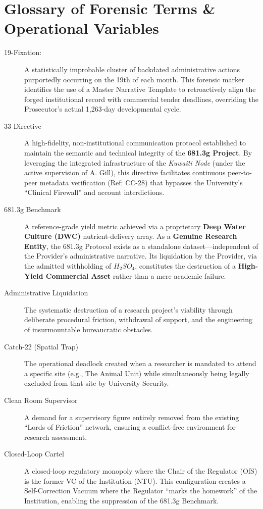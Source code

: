\documentclass{EMBASSY}
\begin{document}
\section{Glossary of Forensic Terms \& Operational Variables}
\begin{description}
	\item[19-Fixation:] A statistically improbable cluster of backdated administrative actions purportedly occurring on the 19th of each month. This forensic marker identifies the use of a Master Narrative Template to retroactively align the forged institutional record with commercial tender deadlines, overriding the Prosecutor’s actual 1,263-day developmental cycle.
	\item[33 Directive] A high-fidelity, non-institutional communication protocol established to maintain the semantic and technical integrity of the \textbf{681.3g Project}. By leveraging the integrated infrastructure of the \textit{Kuwaiti Node} (under the active supervision of A. Gill), this directive facilitates continuous peer-to-peer metadata verification (Ref: CC-28) that bypasses the University's ``Clinical Firewall'' and account interdictions.
	\item[681.3g Benchmark] A reference-grade yield metric achieved via a proprietary \textbf{Deep Water Culture (DWC)} nutrient-delivery array. As a \textbf{Genuine Research Entity}, the 681.3g Protocol exists as a standalone dataset---independent of the Provider's administrative narrative. Its liquidation by the Provider, via the admitted withholding of $H_2SO_4$, constitutes the destruction of a \textbf{High-Yield Commercial Asset} rather than a mere academic failure.
	\item[Administrative Liquidation] The systematic destruction of a research project’s viability through deliberate procedural friction, withdrawal of support, and the engineering of insurmountable bureaucratic obstacles.
	\item[Catch-22 (Spatial Trap)] The operational deadlock created when a researcher is mandated to attend a specific site (e.g., The Animal Unit) while simultaneously being legally excluded from that site by University Security.
	\item[Clean Room Supervisor] A demand for a supervisory figure entirely removed from the existing ``Lords of Friction'' network, ensuring a conflict-free environment for research assessment.
	\item[Closed-Loop Cartel] A closed-loop regulatory monopoly where the Chair of the Regulator (OfS) is the former VC of the Institution (NTU). This configuration creates a Self-Correction Vacuum where the Regulator ``marks the homework'' of the Institution, enabling the suppression of the 681.3g Benchmark.

\end{description}
\end{document}
